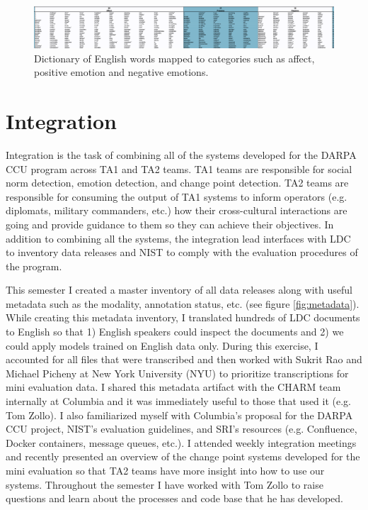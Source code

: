 \documentclass[12pt]{article}
\begin{document}
\begin{figure}[H]
    \centering
    \includegraphics[width=1.0\textwidth]{dictionary.png}
    \caption{Dictionary of English words mapped to categories such as affect, positive emotion and negative emotions.}
    \label{fig:dictionary}
\end{figure}

\section{Integration}
Integration is the task of combining all of the systems developed for the DARPA CCU program across TA1 and TA2 teams. TA1 teams are responsible for social norm detection, emotion detection, and change point detection. TA2 teams are responsible for consuming the output of TA1 systems to inform operators (e.g. diplomats, military commanders, etc.) how their cross-cultural interactions are going and provide guidance to them so they can achieve their objectives. In addition to combining all the systems, the integration lead interfaces with LDC to inventory data releases and NIST to comply with the evaluation procedures of the program.

This semester I created a master inventory of all data releases along with useful metadata such as the modality, annotation status, etc. (see figure 
\ref{fig:metadata}). While creating this metadata inventory, I translated hundreds of LDC documents to English so that 1) English speakers could inspect the documents and 2) we could apply models trained on English data only. During this exercise, I accounted for all files that were transcribed and then worked with Sukrit Rao and Michael Picheny at New York University (NYU) to prioritize transcriptions for mini evaluation data. I shared this metadata artifact with the CHARM team internally at Columbia and it was immediately useful to those that used it (e.g. Tom Zollo). I also familiarized myself with Columbia's proposal for the DARPA CCU project, NIST's evaluation guidelines, and SRI's resources (e.g. Confluence, Docker containers, message queues, etc.). I attended weekly integration meetings and recently presented an overview of the change point systems developed for the mini evaluation so that TA2 teams have more insight into how to use our systems. Throughout the semester I have worked with Tom Zollo to raise questions and learn about the processes and code base that he has developed. 
\end{document}
